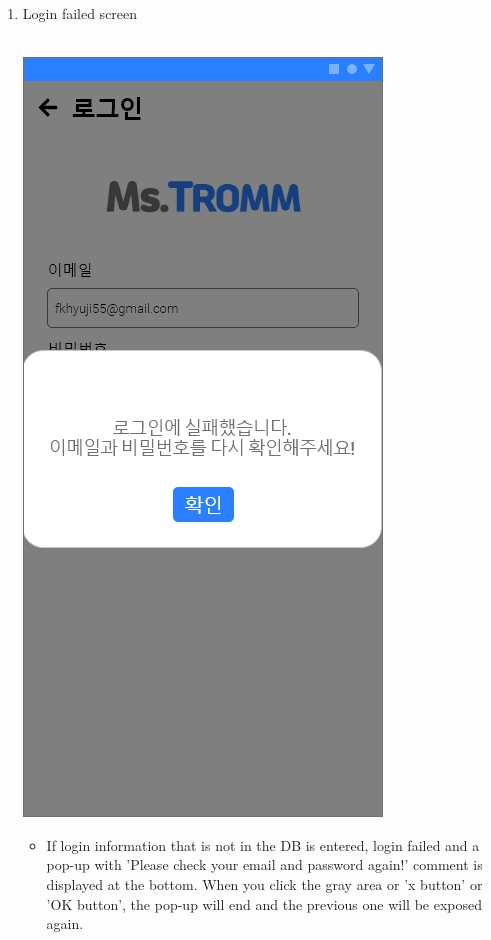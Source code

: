 \documentclass[conference]{IEEEtran}
\begin{document}
\begin{enumerate}
\begin{itemize}
    \end{itemize}
    \item Login failed screen \\\\
    \centerline{\includegraphics[scale=0.32]{assets/로그인2.jpg}}
    \begin{itemize}
    \item[] If login information that is not in the DB is entered, login failed and a pop-up with 'Please check your email and password again!' comment is displayed at the bottom. When you click the gray area or 'x button' or 'OK button', the pop-up will end and the previous one will be exposed again. \\ \\
    \end{itemize}

\end{enumerate}
\end{document}

